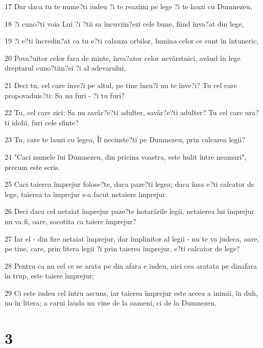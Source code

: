\par 17 Dar daca tu te nume?ti iudeu ?i te reazimi pe lege ?i te lauzi cu Dumnezeu,
\par 18 ?i cuno?ti voia Lui ?i ?tii sa încuviin?ezi cele bune, fiind înva?at din lege,
\par 19 ?i e?ti încredin?at ca tu e?ti calauza orbilor, lumina celor ce sunt în întuneric,
\par 20 Pova?uitor celor fara de minte, înva?ator celor nevârstnici, având în lege dreptarul cuno?tiin?ei ?i al adevarului,
\par 21 Deci tu, cel care înve?i pe altul, pe tine însu?i nu te înve?i? Tu cel care propovaduie?ti: Sa nu furi - ?i tu furi?
\par 22 Tu, cel care zici: Sa nu savâr?e?ti adulter, savâr?e?ti adulter? Tu cel care ura?ti idolii, furi cele sfinte?
\par 23 Tu, care te lauzi cu legea, Îl necinste?ti pe Dumnezeu, prin calcarea legii?
\par 24 "Caci numele lui Dumnezeu, din pricina voastra, este hulit între neamuri", precum este scris.
\par 25 Caci taierea împrejur folose?te, daca paze?ti legea; daca însa e?ti calcator de lege, taierea ta împrejur s-a facut netaiere împrejur.
\par 26 Deci daca cel netaiat împrejur paze?te hotarârile legii, netaierea lui împrejur nu va fi, oare, socotita ca taiere împrejur?
\par 27 Iar el - din fire netaiat împrejur, dar împlinitor al legii - nu te va judeca, oare, pe tine, care, prin litera legii ?i prin taierea împrejur, e?ti calcator de lege?
\par 28 Pentru ca nu cel ce se arata pe din afara e iudeu, nici cea aratata pe dinafara în trup, este taiere împrejur;
\par 29 Ci este iudeu cel întru ascuns, iar taierea împrejur este aceea a inimii, în duh, nu în litera; a carui lauda nu vine de la oameni, ci de la Dumnezeu.

\chapter{3}

